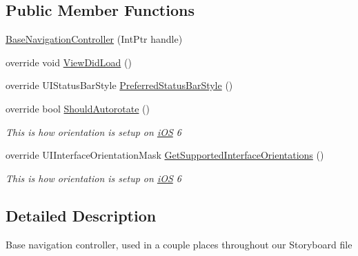 \subsection*{Public Member Functions}
\begin{DoxyCompactItemize}
\item 
\hyperlink{class_field_service_1_1i_o_s_1_1_base_navigation_controller_ab1c65649eddaae044c12c283bc9cc471}{Base\+Navigation\+Controller} (Int\+Ptr handle)
\item 
override void \hyperlink{class_field_service_1_1i_o_s_1_1_base_navigation_controller_a1e2d2f415ee2950cea2c34fca8fca87b}{View\+Did\+Load} ()
\item 
override U\+I\+Status\+Bar\+Style \hyperlink{class_field_service_1_1i_o_s_1_1_base_navigation_controller_a598ee6d3d4916d084d0192ff5efa5e17}{Preferred\+Status\+Bar\+Style} ()
\item 
override bool \hyperlink{class_field_service_1_1i_o_s_1_1_base_navigation_controller_aa72c52249c57d879febf749d0c737c3e}{Should\+Autorotate} ()
\begin{DoxyCompactList}\small\item\em This is how orientation is setup on \hyperlink{namespace_field_service_1_1i_o_s}{i\+O\+S} 6 \end{DoxyCompactList}\item 
override U\+I\+Interface\+Orientation\+Mask \hyperlink{class_field_service_1_1i_o_s_1_1_base_navigation_controller_aa5b0d7dcf2d06d50be315519d2a18046}{Get\+Supported\+Interface\+Orientations} ()
\begin{DoxyCompactList}\small\item\em This is how orientation is setup on \hyperlink{namespace_field_service_1_1i_o_s}{i\+O\+S} 6 \end{DoxyCompactList}\end{DoxyCompactItemize}


\subsection{Detailed Description}
Base navigation controller, used in a couple places throughout our Storyboard file 



